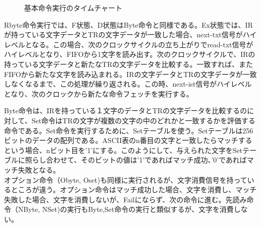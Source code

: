 \documentclass[paper]{ieicej}
\begin{document}
\begin{figure}[h]
       \caption{基本命令実行のタイムチャート }
\end{figure}

Rbyte命令実行では、F状態、D状態はByte命令と同様である。Ex状態では、IRが持っている文字データとTRの文字データが一致した場合、next-txt信号がハイレベルとなる。この場合、次のクロックサイクルの立ち上がりでread-txt信号がハイレベルとなり、FIFOから1文字を読み出す。次のクロックサイクルで、IRの持っている文字データと新たなTRの文字データを比較する。一致すれば、またFIFOから新たな文字を読み込まれる。IRの文字データとTRの文字データが一致しなくなるまで、この処理が繰り返される。この時、next-ist信号がハイレベルとなり、次のクロックから新たな命令フェッチを実行する。

Byte命令は、IRを持っている１文字のデータとTRの文字データを比較するのに対して、Set命令はTRの文字が複数の文字の中のどれかと一致するかを評価する命令である。Set命令を実行するために、Setテーブルを使う。Setテーブルは256ビットのデータの配列である。ASCII表のn番目の文字と一致したらマッチするという場合、nビット目を'1'にする。このようにして、与えられた文字をSetテーブルに照らし合わせて、そのビットの値は'1'であればマッチ成功、'0'であればマッチ失敗となる。\\

オプション命令（Obyte, Oset)も同様に実行されるが、文字消費信号を持っているところが違う。オプション命令はマッチ成功した場合、文字を消費し、マッチ失敗した場合、文字を消費しないが、Failにならず、次の命令に進む。先読み命令（NByte, NSet)の実行もByte,Set命令の実行と類似するが、文字を消費しない。\\
\end{document}
